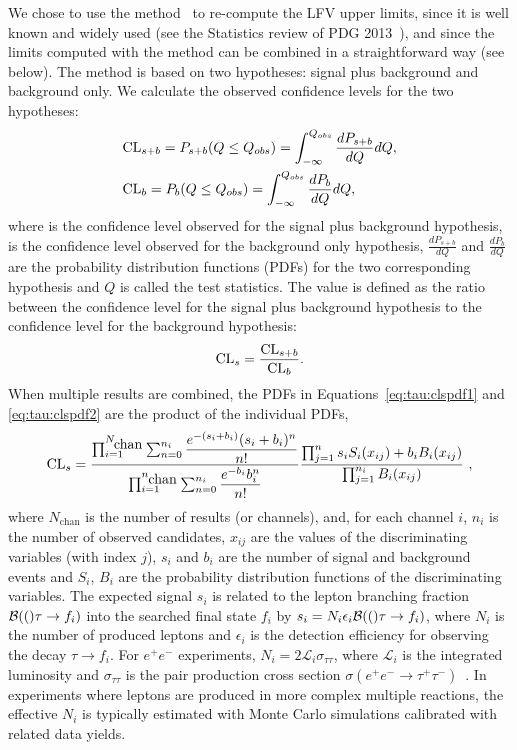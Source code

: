 We chose to use the \cls method~\cite{Read:2002hq} to re-compute the
\mtau LFV upper limits, since it is well known and widely used (see the
Statistics review of PDG 2013~\cite{PDG_2012}), and since the
limits computed with the \cls method can be combined in a straightforward
way (see below). The \cls method is based on two hypotheses: signal plus background and
background only. We calculate the observed confidence levels for the two
hypotheses:
\begin{align}
&\mbox{CL}_{s+b} = P_{s+b}(Q \leq Q_{obs}) = \int_{- \infty}^{Q_{obs}} \frac{dP_{s+b}}{dQ} dQ,
\label{eq:tau:clspdf1} \\
&\mbox{CL}_b = P_{b}(Q \leq Q_{obs}) = \int_{- \infty}^{Q_{obs}} \frac{dP_{b}}{dQ} dQ,
\label{eq:tau:clspdf2}
\end{align}
where \clsb is the confidence level observed for the signal plus background
hypothesis, \clb is the confidence level observed for the background only
hypothesis, $\frac{dP_{s+b}}{dQ}$ and $\frac{dP_{b}}{dQ}$ are the probability
distribution functions (PDFs) for the two corresponding hypothesis and
$Q$ is called the test statistics. The \cls value is defined as the ratio
between the confidence level for the signal plus background hypothesis to
the confidence level for the background hypothesis:
\begin{align}
\mbox{CL}_s = \dfrac{\mbox{CL}_{s+b}}{\mbox{CL}_b}.
\end{align}
When multiple results are combined, the PDFs in
Equations~\ref{eq:tau:clspdf1} and \ref{eq:tau:clspdf2} are the
product of the individual PDFs,
\begin{align}
\mbox{CL}_s = \dfrac{\prod_{i=1}^{N_{\mbox{chan}}}\sum_{n=0}^{n_i} \dfrac{e^{-(s_i+b_i)} (s_i+b_i)^{n}}{n!} }{\prod_{i=1}^{n_{\mbox{chan}}}  \sum_{n=0}^{n_i} \dfrac{e^{-b_i} b_i^{n}}{n!}}    \dfrac{\prod_{j=1}^{n} s_iS_i(x_{ij})+b_iB_i(x_{ij})}{\prod_{j=1}^{n_i}B_i(x_{ij})}~,
\end{align}
where $N_{\text{chan}}$ is the number of results (or channels), and, for each channel $i$,
$n_i$ is the number of observed candidates, $x_{ij}$ are the values of the
discriminating variables (with index $j$), $s_i$ and $b_i$ are the number
of signal and background events and $S_i$, $B_i$ are the probability
distribution functions of the discriminating variables.
The expected signal $s_i$ is related to the \mtau lepton branching
fraction ${\cal B}(()\tau \rightarrow f_i)$ into
the searched final state $f_i$ by $s_i = N_i\epsilon_i{\cal B}(()\tau \rightarrow
f_i)$, where $N_i$ is the number of produced \mtau leptons and
$\epsilon_i$ is the detection efficiency for observing the decay $\tau\to
f_i$. For $e^+ e^-$ experiments,
$N_i = 2\mathcal{L}_i\sigma_{\tau\tau}$, where $\mathcal{L}_i$ is the
integrated luminosity and $\sigma_{\tau\tau}$ is the
\mtau pair production cross section $\sigma(e^+ e^- \rightarrow \tau^+
\tau^-)$~\cite{Banerjee:2007is}.
In experiments where \mtau leptons are produced in more complex multiple
reactions, the effective $N_i$ is typically estimated with Monte Carlo simulations
calibrated with related data yields.

